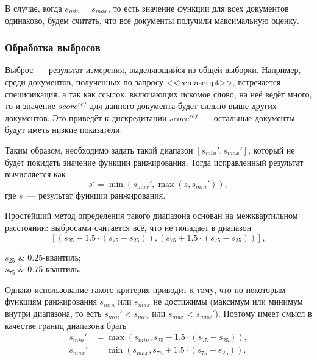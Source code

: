В случае, когда $s_{min}=s_{max}$, то есть значение функции для всех документов одинаково, будем считать, что все документы получили максимальную оценку.


\subsubsection{Обработка выбросов} \label{sssec:outlier}
Выброс~--- результат измерения, выделяющийся из общей выборки. Например, среди документов, полученных по запросу <<ecmascript>>, встречается спецификация, а так как ссылок, включающих искомое слово, на неё ведёт много, то и значение $score^{ref}$ для данного документа будет сильно выше других документов. Это приведёт к дискредитации $score^{ref}$~--- остальные документы будут иметь низкие показатели.

Таким образом, необходимо задать такой диапазон $[s_{min}', s_{max}']$, который не будет покидать значение функции ранжирования. Тогда исправленный результат вычисляется как
\begin{equation}
  s' = \min(s_{max}', \max(s, s_{min}')),
\end{equation}
где $s$~--- результат функции ранжирования.

Простейший метод определения такого диапазона основан на межквартильном расстоянии: выбросами считается всё, что не попадает в диапазон
\begin{equation}
  \left[(s_{25}-1.5\cdot (s_{75}-s_{25})), (s_{75}+1.5\cdot (s_{75}-s_{25}))\right],
\end{equation}
\begin{conditions}
  $s_{25}$ & 0.25-квантиль;\\
  $s_{75}$ & 0.75-квантиль.
\end{conditions}

Однако использование такого критерия приводит к тому, что по некоторым функциям ранжирования $s_{min}$ или $s_{max}$ не достижимы (максимум или минимум внутри диапазона, то есть $s_{min}' < s_{min}$ или $s_{max} < s_{max}'$). Поэтому имеет смысл в качестве границ диапазона брать
\begin{equation}
  \begin{split}
    s_{min}'&=\max(s_{min}, s_{25}-1.5\cdot (s_{75}-s_{25})),\\
    s_{max}'&=\min(s_{max}, s_{75}+1.5\cdot (s_{75}-s_{25})).
  \end{split}
\end{equation}


